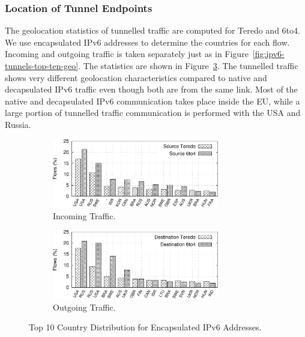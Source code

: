 \subsubsection{Location of Tunnel Endpoints}
The geolocation statistics of tunnelled traffic are computed for Teredo and 6to4. We use encapsulated IPv6 addresses to determine the countries for each flow. Incoming and outgoing traffic is taken separately just as in Figure~\ref{fig:ipv6-tunnels-top-ten-geo}. The statistics are shown in Figure~\ref{fig:ipv6-tunnels-geo-tun-both}.
The tunnelled traffic shows very different geolocation characteristics compared to native and decapsulated IPv6 traffic even though both are from the same link. 
Most of the native and decapsulated IPv6 communication takes place inside the EU, while a large portion of tunnelled traffic communication is performed with the USA and Russia. 

\begin{figure}[!tb]
    \begin{subfigure}{\textwidth}
        \centering
        \includegraphics[width=0.8\textwidth]{figures/paper-tunnels/ctry_distribution/ctry_distribution-tun-in}
        \caption{Incoming Traffic.}
        \label{fig:ipv6-tunnels-geo-tun-in}
    \end{subfigure}
    \begin{subfigure}{\textwidth}
        \centering
        \includegraphics[width=0.8\textwidth]{figures/paper-tunnels/ctry_distribution/ctry_distribution-tun-out}
        \caption{Outgoing Traffic.}
        \label{fig:ipv6-tunnels-eo-tun-out}
    \end{subfigure}
    \caption{Top 10 Country Distribution for Encapsulated IPv6 Addresses.}
    \label{fig:ipv6-tunnels-geo-tun-both}
\end{figure}

